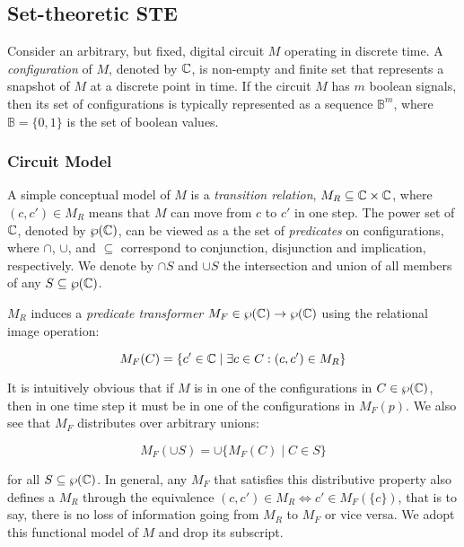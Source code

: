 \subsection{Set-theoretic STE} \label{sec:set-ste}

Consider an arbitrary, but fixed, digital circuit $M$ operating in discrete time. A \textit{configuration} of $M$, denoted by $\mathbb{C}$, is non-empty and finite set that represents a snapshot of $M$ at a discrete point in time. If the circuit $M$ has $m$ boolean signals, then its set of configurations is typically represented as a sequence $\mathbb{B}^{m}$, where $\mathbb{B} = \{ 0,1 \}$ is the set of boolean values.

\subsubsection{Circuit Model} A simple conceptual model of $M$ is a \textit{transition relation}, $M_{R} \subseteq \mathbb{C} \times \mathbb{C}$, where $(c,c') \in M_{R}$ means that $M$ can move from $c$ to $c'$ in one step\footnotemark. The power set of $\mathbb{C}$, denoted by $\wp(\mathbb{C})$, can be viewed as a the set of \textit{predicates} on configurations, where $\cap$, $\cup$, and $\subseteq$ correspond to conjunction, disjunction and implication, respectively. We denote by $\cap S$ and $\cup S$ the intersection and union of all members of any $S \subseteq \wp(\mathbb{C})$.


$M_{R}$ induces a \textit{predicate transformer} $M_{F} \in \wp(\mathbb{C}) \rightarrow \wp(\mathbb{C})$ using the relational image operation:

\begin{equation*}
M_{F}(C) = \{ c' \in \mathbb{C} \mid \exists c \in C : (c,c') \in M_{R} \}
\end{equation*}

\noindent It is intuitively obvious that if $M$ is in one of the configurations in $C \in \wp(\mathbb{C})$, then in one time step it must be in one of the configurations in $M_{F}(p)$. We also see that $M_{F}$ distributes over arbitrary unions:

\begin{equation*}
M_{F}(\cup S) = \cup \{ M_{F}(C) \mid C \in S \}
\end{equation*}

\noindent for all $S \subseteq \wp(\mathbb{C})$. In general, any $M_{F}$ that satisfies this distributive property also defines a $M_{R}$ through the equivalence $(c,c') \in M_{R} \iff c' \in M_{F}(\{ c \})$, that is to say, there is no loss of information going from $M_{R}$ to $M_{F}$ or vice versa. We adopt this functional model of $M$ and drop its subscript.

